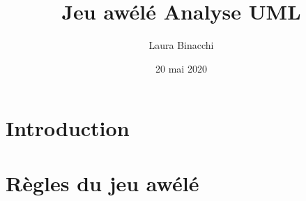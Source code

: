 \documentclass{article}
\title{Jeu awélé\bigbreak \bigbreak
    \large Analyse UML}
\date{20 mai 2020}
\author{Laura Binacchi}
\begin{document}
    
    \newpage
    \tableofcontents
    \newpage

    \section*{Introduction}
    \label{sec:intro}

    \paragraph{}

    \paragraph{}

    \paragraph{}

    
    \paragraph{}


    \newpage
    \section{Règles du jeu awélé}
\end{document}
